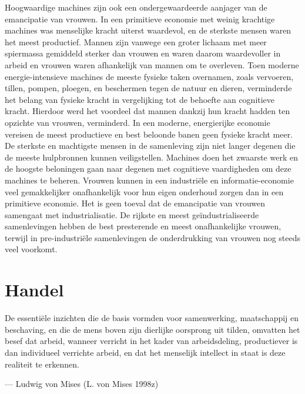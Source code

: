\documentclass[
  a5paper,
  smalldemyvopaper,11pt,twoside,onecolumn,openright,extrafontsizes,
hidelinks]{memoir}
\begin{document}
Hoogwaardige machines zijn ook een ondergewaardeerde aanjager van de
emancipatie van vrouwen. In een primitieve economie met weinig krachtige
machines was menselijke kracht uiterst waardevol, en de sterkste mensen
waren het meest productief. Mannen zijn vanwege een groter lichaam met
meer spiermassa gemiddeld sterker dan vrouwen en waren daarom
waardevoller in arbeid en vrouwen waren afhankelijk van mannen om te
overleven. Toen moderne energie-intensieve machines de meeste fysieke
taken overnamen, zoals vervoeren, tillen, pompen, ploegen, en beschermen
tegen de natuur en dieren, verminderde het belang van fysieke kracht in
vergelijking tot de behoefte aan cognitieve kracht. Hierdoor werd het
voordeel dat mannen dankzij hun kracht hadden ten opzichte van vrouwen,
verminderd. In een moderne, energierijke economie vereisen de meest
productieve en best beloonde banen geen fysieke kracht meer. De sterkste
en machtigste mensen in de samenleving zijn niet langer degenen die de
meeste hulpbronnen kunnen veiligstellen. Machines doen het zwaarste werk
en de hoogste beloningen gaan naar degenen met cognitieve vaardigheden
om deze machines te beheren. Vrouwen kunnen in een industriële en
informatie-economie veel gemakkelijker onafhankelijk voor hun eigen
onderhoud zorgen dan in een primitieve economie. Het is geen toeval dat
de emancipatie van vrouwen samengaat met industrialisatie. De rijkste en
meest geïndustrialiseerde samenlevingen hebben de best presterende en
meest onafhankelijke vrouwen, terwijl in pre-industriële samenlevingen
de onderdrukking van vrouwen nog steeds veel voorkomt.

\chapter{Handel}\label{sec-handel}

De essentiële inzichten die de basis vormden voor samenwerking,
maatschappij en beschaving, en die de mens boven zijn dierlijke
oorsprong uit tilden, omvatten het besef dat arbeid, wanneer verricht in
het kader van arbeidsdeling, productiever is dan individueel verrichte
arbeid, en dat het menselijk intellect in staat is deze realiteit te
erkennen.

--- Ludwig von Mises (L. von Mises 1998z)
\end{document}
